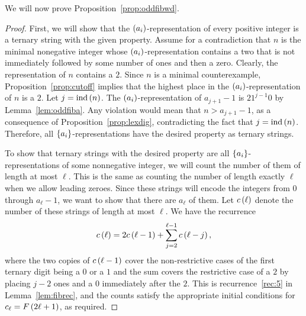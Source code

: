 \documentclass[english,12pt]{article}
\newcommand{\seq}{\p}
\DeclareMathOperator{\ind}{ind}
\begin{document}
We will now prove Proposition~\ref{prop:oddfibwd}.
\begin{proof}
First, we will show that the $\seq{a_i}$-representation of every positive integer is a ternary string with the given property.  Assume for a contradiction that $n$ is the minimal nonegative integer whose $\seq{a_i}$-representation contains a two that is not immediately followed by some number of ones and then a zero.  Clearly, the representation of $n$ contains a $2$.  Since $n$ is a minimal counterexample, Proposition~\ref{prop:cutoff} implies that the highest place in the $\seq{a_i}$-representation of $n$ is a $2$.
Let $j=\ind\p{n}$.  The $\seq{a_i}$-representation of $a_{j+1}-1$ is $21^{j-1}0$ by Lemma~\ref{lem:oddfiba}.  Any violation would mean that $n>a_{j+1}-1$, as a consequence of Proposition~\ref{prop:lexdig}, contradicting the fact that $j=\ind\p{n}$.  Therefore, all $\left\{a_i\right\}$-representations have the desired property as ternary strings.

To show that ternary strings with the desired property are all $\left\{a_i\right\}$-representations of some nonnegative integer, we will count the number of them of length at most $\ell$.  This is the same as counting the number of length exactly $\ell$ when we allow leading zeroes.  Since these strings will encode the integers from $0$ through $a_\ell-1$, we want to show that there are $a_\ell$ of them.  Let $c\left(\ell\right)$ denote the number of these strings of length at most $\ell$.  We have the recurrence
\[
c\left(\ell\right)=2c\left(\ell-1\right)+\sum_{j=2}^{\ell-1}c\left(\ell-j\right),
\]
where the two copies of $c\left(\ell-1\right)$ cover the non-restrictive cases of the first ternary digit being a $0$ or a $1$ and the sum covers the restrictive case of a $2$ by placing $j-2$ ones and a $0$ immediately after the $2$.
This is recurrence~\ref{rec:5} in Lemma~\ref{lem:fibrec}, and the counts satisfy the appropriate initial conditions for $c_\ell=F\left(2\ell+1\right)$, as required.
\end{proof}
\end{document}
